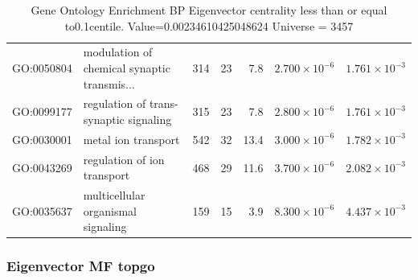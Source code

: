 \begin{table}[ht]
\begin{tabular}{llrrrrr}
  GO:0050804 & modulation of chemical synaptic transmis... & 314 & 23 & 7.8 & $2.700 \times 10^{-6}$ & $1.761 \times 10^{-3}$ \\ 
  GO:0099177 & regulation of trans-synaptic signaling & 315 & 23 & 7.8 & $2.800 \times 10^{-6}$ & $1.761 \times 10^{-3}$ \\ 
  GO:0030001 & metal ion transport & 542 & 32 & 13.4 & $3.000 \times 10^{-6}$ & $1.782 \times 10^{-3}$ \\ 
  GO:0043269 & regulation of ion transport & 468 & 29 & 11.6 & $3.700 \times 10^{-6}$ & $2.082 \times 10^{-3}$ \\ 
  GO:0035637 & multicellular organismal signaling & 159 & 15 & 3.9 & $8.300 \times 10^{-6}$ & $4.437 \times 10^{-3}$ \\ 
   \hline
\end{tabular}
\caption{Gene Ontology Enrichment BP Eigenvector centrality  less than or equal to0.1centile.   Value=0.00234610425048624 Universe = 3457} 
\label{tab:Gene Ontology Enrichment BP Eigenvector centrality  less than or equal to0.1centile.   Value=0.00234610425048624 Universe = 3457}
\end{table}

\subsubsection{Eigenvector MF topgo}

